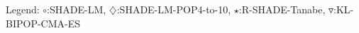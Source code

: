 Legend: {\color{NavyBlue}$\circ$}:SHADE-LM, {\color{Magenta}$\diamondsuit$}:SHADE-LM-POP4-to-10, {\color{Orange}$\star$}:R-SHADE-Tanabe, {\color{CornflowerBlue}$\triangledown$}:KL-BIPOP-CMA-ES